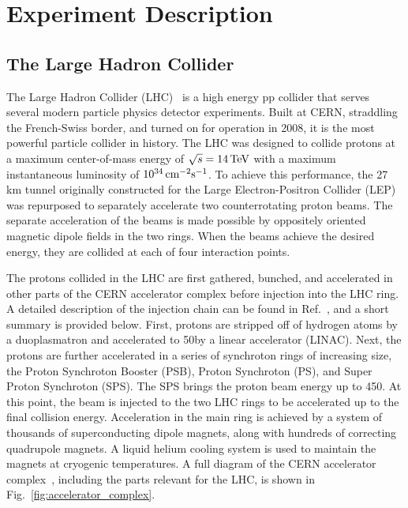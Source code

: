 \chapter{Experiment Description}\label{sec:experiment}

\section{The Large Hadron Collider}
The Large Hadron Collider (LHC)~\cite{Evans_2008} is a high energy pp collider that serves several modern particle physics detector experiments. 
Built at CERN, straddling the French-Swiss border, and turned on for operation in 2008, it is the most powerful particle collider in history. 
The LHC was designed to collide protons at a maximum center-of-mass energy of $\sqrt s = 14\,\text{Te\hspace{-.08em}V}$ 
with a maximum instantaneous luminosity of $10^{34}\,\text{cm}^{-2}\mathrm{s}^{-1}$. To achieve this performance, the 27 km tunnel 
originally constructed for the Large Electron-Positron Collider (LEP)~\cite{Myers:226776} was repurposed to separately 
accelerate two counterrotating proton beams. The separate acceleration of the beams is made possible by oppositely oriented 
magnetic dipole fields in the two rings. When the beams achieve the desired energy, they are collided at each of four interaction points. 

The protons collided in the LHC are first gathered, bunched, and accelerated in other parts of the CERN accelerator complex before injection into the LHC ring. A detailed description of the injection chain can be found in Ref.~\cite{Benedikt:2004wm}, and a short summary is provided below. 
First, protons are stripped off of hydrogen atoms by a duoplasmatron and accelerated to 50\MeV by a linear accelerator (LINAC). Next, the protons are further accelerated 
in a series of synchroton rings of increasing size, the Proton Synchroton Booster (PSB), Proton Synchroton (PS), and Super Proton Synchroton (SPS). The SPS brings the 
proton beam energy up to 450\GeV. At this point, the beam is injected to the two LHC rings to be accelerated up to the final collision energy. Acceleration in the main 
ring is achieved by a system of thousands of superconducting dipole magnets, along with hundreds of correcting quadrupole magnets. A liquid helium cooling system is 
used to maintain the magnets at cryogenic temperatures. A full diagram of the CERN accelerator complex~\cite{CERN_complex}, including the parts relevant for the LHC, is shown in Fig.~\ref{fig:accelerator_complex}.

